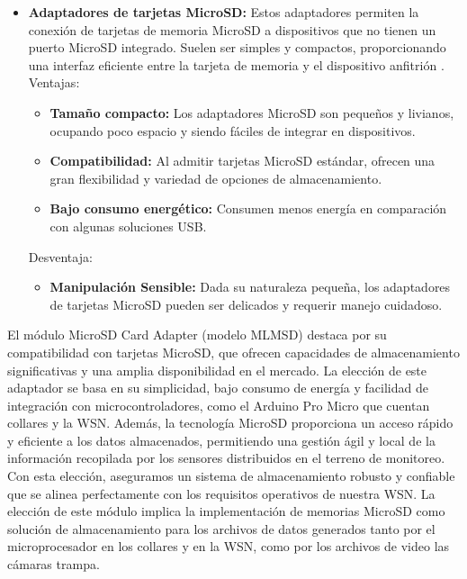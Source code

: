 \begin{itemize}
\item \textbf{Adaptadores de tarjetas MicroSD:} Estos adaptadores permiten la conexión de tarjetas de memoria MicroSD a dispositivos que no tienen un puerto MicroSD integrado. Suelen ser simples y compactos, proporcionando una interfaz eficiente entre la tarjeta de memoria y el dispositivo anfitrión \cite{122}.
Ventajas:
\begin{itemize}[label=o]
\item \textbf{Tamaño compacto:} Los adaptadores MicroSD son pequeños y livianos, ocupando poco espacio y siendo fáciles de integrar en dispositivos.
\item \textbf{Compatibilidad:} Al admitir tarjetas MicroSD estándar, ofrecen una gran flexibilidad y variedad de opciones de almacenamiento.
\item \textbf{Bajo consumo energético:} Consumen menos energía en comparación con algunas soluciones USB.
\end{itemize}
Desventaja:
\begin{itemize}[label=o]
\item \textbf{
Manipulación Sensible:} Dada su naturaleza pequeña, los adaptadores de tarjetas MicroSD pueden ser delicados y requerir manejo cuidadoso.
\end{itemize}
\end{itemize}
El módulo MicroSD Card Adapter (modelo MLMSD) destaca por su compatibilidad con tarjetas MicroSD, que ofrecen capacidades de almacenamiento significativas y una amplia disponibilidad en el mercado. La elección de este adaptador se basa en su simplicidad, bajo consumo de energía y facilidad de integración con microcontroladores, como el Arduino Pro Micro que cuentan collares y la WSN. Además, la tecnología MicroSD proporciona un acceso rápido y eficiente a los datos almacenados, permitiendo una gestión ágil y local de la información recopilada por los sensores distribuidos en el terreno de monitoreo. Con esta elección, aseguramos un sistema de almacenamiento robusto y confiable que se alinea perfectamente con los requisitos operativos de nuestra WSN.
La elección de este módulo implica la implementación de memorias MicroSD como solución de almacenamiento para los archivos de datos generados tanto por el microprocesador en los collares y en la WSN, como por los archivos de video las cámaras trampa.

\newpage
